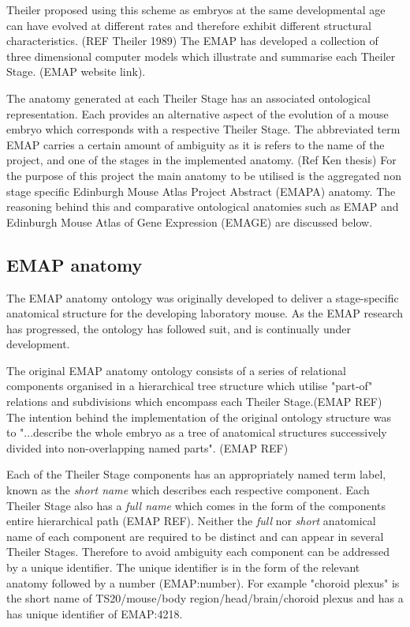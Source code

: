 Theiler proposed using this scheme as embryos at the same developmental age can have evolved at different rates and therefore exhibit different structural characteristics. (REF Theiler 1989) The EMAP has developed a collection of three dimensional computer models which illustrate and summarise each Theiler Stage. (EMAP website link). 

The anatomy generated at each Theiler Stage has an associated ontological representation. Each provides an alternative aspect of the evolution of a mouse embryo which corresponds with a respective Theiler Stage. The abbreviated term EMAP carries a certain amount of ambiguity as it is refers to the name of the project, and one of the stages in the implemented anatomy. (Ref Ken thesis)  For the purpose of this project the main anatomy to be utilised is the aggregated non stage specific Edinburgh Mouse Atlas Project Abstract (EMAPA) anatomy. The reasoning behind this and comparative ontological anatomies such as EMAP and Edinburgh Mouse Atlas of Gene Expression (EMAGE) are discussed below.

\subsection{EMAP anatomy}
The EMAP anatomy ontology was originally developed to deliver a stage-specific anatomical structure for the developing laboratory mouse. As the EMAP research has progressed, the ontology has followed suit, and is continually under development.

The original EMAP anatomy ontology consists of a series of relational components organised in a hierarchical tree structure which utilise "part-of" relations and subdivisions which encompass each Theiler Stage.(EMAP REF) The intention behind the implementation of the original ontology structure was to "...describe the whole embryo as a tree of anatomical structures successively divided into non-overlapping named parts". (EMAP REF)

Each of the Theiler Stage components has an appropriately named term label, known as the \textit{short name} which describes each respective component. Each Theiler Stage also has a \textit{full name} which comes in the form of the components entire hierarchical path (EMAP REF). Neither the \textit{full} nor \textit{short} anatomical name of each component are required to be distinct and can appear in several Theiler Stages. Therefore to avoid ambiguity each component can be addressed by a unique identifier. The unique identifier is in the form of the relevant anatomy followed by a number (EMAP:number). For example "choroid plexus" is the short name of TS20/mouse/body region/head/brain/choroid plexus and has a has unique identifier of EMAP:4218.

